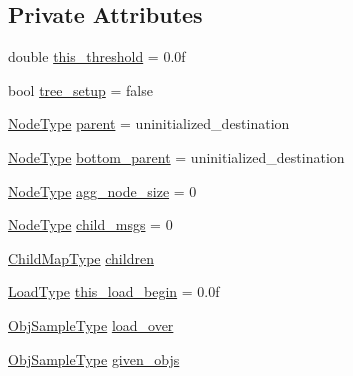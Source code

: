 \subsection*{Private Attributes}
\begin{DoxyCompactItemize}
\item 
double \hyperlink{structvt_1_1vrt_1_1collection_1_1lb_1_1_hierarchical_l_b_a7a1f6d8e3b327da08a682b344c7eaa08}{this\+\_\+threshold} = 0.\+0f
\item 
bool \hyperlink{structvt_1_1vrt_1_1collection_1_1lb_1_1_hierarchical_l_b_abd4e7b54c632de1dc2f2751676328f3d}{tree\+\_\+setup} = false
\item 
\hyperlink{namespacevt_a866da9d0efc19c0a1ce79e9e492f47e2}{Node\+Type} \hyperlink{structvt_1_1vrt_1_1collection_1_1lb_1_1_hierarchical_l_b_a92d34872e6196a0ba2e2097e944d05cc}{parent} = uninitialized\+\_\+destination
\item 
\hyperlink{namespacevt_a866da9d0efc19c0a1ce79e9e492f47e2}{Node\+Type} \hyperlink{structvt_1_1vrt_1_1collection_1_1lb_1_1_hierarchical_l_b_a613ebde72cb389a12eb7a522e0a5a690}{bottom\+\_\+parent} = uninitialized\+\_\+destination
\item 
\hyperlink{namespacevt_a866da9d0efc19c0a1ce79e9e492f47e2}{Node\+Type} \hyperlink{structvt_1_1vrt_1_1collection_1_1lb_1_1_hierarchical_l_b_aa2ef8e33aaed4f1ae6405a3652de21bc}{agg\+\_\+node\+\_\+size} = 0
\item 
\hyperlink{namespacevt_a866da9d0efc19c0a1ce79e9e492f47e2}{Node\+Type} \hyperlink{structvt_1_1vrt_1_1collection_1_1lb_1_1_hierarchical_l_b_aebc5548aa06994f3dffd752a36789d80}{child\+\_\+msgs} = 0
\item 
\hyperlink{structvt_1_1vrt_1_1collection_1_1lb_1_1_hierarchical_l_b_a95e5a93033703216cad8ec7a3da7a2ef}{Child\+Map\+Type} \hyperlink{structvt_1_1vrt_1_1collection_1_1lb_1_1_hierarchical_l_b_af79c0b7d47eb39f311a1a604863bd6c4}{children}
\item 
\hyperlink{namespacevt_a8fb51741340b87d7aaee0bef60e9896b}{Load\+Type} \hyperlink{structvt_1_1vrt_1_1collection_1_1lb_1_1_hierarchical_l_b_a2d4333062fc0c28e7774b23300893889}{this\+\_\+load\+\_\+begin} = 0.\+0f
\item 
\hyperlink{structvt_1_1vrt_1_1collection_1_1lb_1_1_load_sampler_base_l_b_a8d939a849ec0d6371c1c4d441ffb9b94}{Obj\+Sample\+Type} \hyperlink{structvt_1_1vrt_1_1collection_1_1lb_1_1_hierarchical_l_b_aced5f1ddf40eb67f0a86ebe56d75d22c}{load\+\_\+over}
\item 
\hyperlink{structvt_1_1vrt_1_1collection_1_1lb_1_1_load_sampler_base_l_b_a8d939a849ec0d6371c1c4d441ffb9b94}{Obj\+Sample\+Type} \hyperlink{structvt_1_1vrt_1_1collection_1_1lb_1_1_hierarchical_l_b_a010367d94903aa52b9e48ecc715820c6}{given\+\_\+objs}

\end{DoxyCompactItemize}
